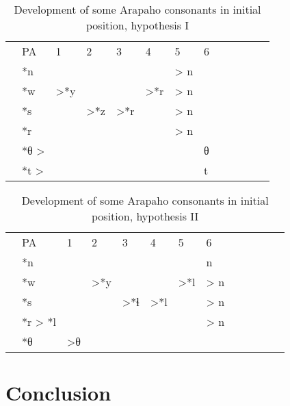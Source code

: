 \documentclass[twoside,a4paper,11pt]{article}
\newcommand{\grise}[1]{\cellcolor{lightgray}\textbf{#1}}
\newcommand{\Σ}{\greek{Σ}}
\begin{document}
\citealt{jacques13arapaho}
\citealt{pentland98}

\begin{table}[H]
\caption{Development of some Arapaho  consonants in initial position, hypothesis I}  \centering
\begin{tabular}{lllllllllllll}
&PA & 1 & 2 & 3 & 4 & 5 & 6 & \\
&*n   &&&&& > n\\
&*w   & >*y  \grise{} & \grise{} & \grise{}  &>*r	  \grise{} &> n \grise{}\\
&*s  &  &>*z &>*r	 \grise{}& 	 \grise{} &> n \grise{}\\
&*r	   & 	&  & 	& 	  &> n \grise{}\\
&*θ >  & &&&&&θ \\
&*t > & &&&&&t \\
\end{tabular}
\end{table}


\begin{table}[H]
\caption{Development of some Arapaho   consonants in initial position, hypothesis II}   \centering
\begin{tabular}{lllllllllllll}
&PA & 1 & 2 & 3 & 4 & 5 & 6   \\
&*n  &&&&&& n\\
&*w   && >*y  \grise{}   & \grise{}& \grise{}   &>*l \grise{} &> n \grise{}\\
&*s  && &  >*ɬ  &>*l \grise{}&  \grise{} & > n \grise{}\\
&*r > *l	 &  &  &    &  &    &> n \grise{}\\
&*θ  &  >θ\\
\end{tabular}
\end{table}


\section{Conclusion}	


 
 
\end{document}

